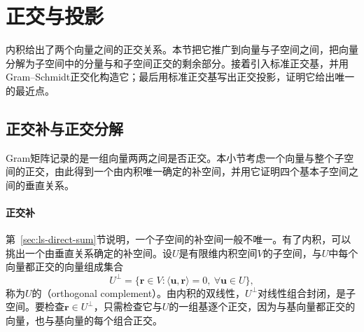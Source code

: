 
\section{正交与投影}
\label{sec:ls-orthogonality-and-projection}

内积给出了两个向量之间的正交关系。本节把它推广到向量与子空间之间，把向量分解为子空间中的分量与和子空间正交的剩余部分。接着引入标准正交基，并用Gram--Schmidt正交化构造它；最后用标准正交基写出正交投影，证明它给出唯一的最近点。

\subsection{正交补与正交分解}
\label{sec:ls-orthogonality}

Gram矩阵记录的是一组向量两两之间是否正交。本小节考虑一个向量与整个子空间的正交，由此得到一个由内积唯一确定的补空间，并用它证明四个基本子空间之间的垂直关系。

\paragraph{正交补}
第~\ref{sec:ls-direct-sum}节说明，一个子空间的补空间一般不唯一。有了内积，可以挑出一个由垂直关系确定的补空间。设$U$是有限维内积空间$V$的子空间，与$U$中每个向量都正交的向量组成集合
\[
 U^\perp=\{\bm r\in V:\langle\bm u,\bm r\rangle=0,\ \forall\bm u\in U\},
\]
称为$U$的（orthogonal complement）。由内积的双线性，$U^\perp$对线性组合封闭，是子空间。要检查$\bm r\in U^\perp$，只需检查它与$U$的一组基逐个正交，因为与基向量都正交的向量，也与基向量的每个组合正交。

